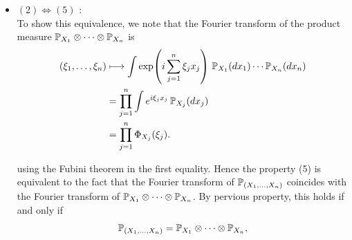 \documentclass[../Main.tex]{subfiles}
\begin{document}
{\begin{itemize}
    \item $(2)\Longleftrightarrow(5)$ : \\  To show this equivalence, we note that the Fourier transform of the product measure $\mathbb{P}_{X_1} \otimes \cdots \otimes \mathbb{P}_{X_n}$ is
\begin{align*}
(\xi_1,\ldots,\xi_n)
&\longmapsto
\int \exp\!\left( i \sum_{j=1}^n \xi_j x_j \right)
\, \mathbb{P}_{X_1}(dx_1) \cdots \mathbb{P}_{X_n}(dx_n) \\
&= \prod_{j=1}^n \int e^{i \xi_j x_j}\, \mathbb{P}_{X_j}(dx_j) \\
&= \prod_{j=1}^n \Phi_{X_j}(\xi_j).
\end{align*}

using the Fubini theorem in the first equality. Hence the property (5) is equivalent to the fact that the Fourier transform of $\mathbb{P}_{(X_1,\ldots,X_n)}$ coincides with the Fourier transform of $\mathbb{P}_{X_1} \otimes \cdots \otimes \mathbb{P}_{X_n}$. By pervious property, this holds if and only if
\[ \mathbb{P}_{(X_1,\ldots,X_n)} = \mathbb{P}_{X_1} \otimes \cdots \otimes \mathbb{P}_{X_n}, \]

\end{itemize}
}
\end{document}
